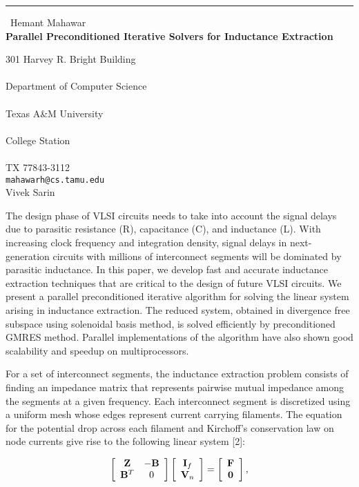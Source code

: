 \documentclass{report}
\begin{document}
\begin{center}
\rule{6in}{1pt} \
{\large Hemant Mahawar \\
{\bf Parallel Preconditioned Iterative Solvers for Inductance Extraction}}

301 Harvey R. Bright Building \\ \\ Department of Computer Science \\ \\ Texas A\&M University \\ \\ College Station \\  \\ TX 77843-3112
\\
{\tt mahawarh@cs.tamu.edu}\\
Vivek Sarin\end{center}

The design phase of VLSI circuits needs to take into account the signal
delays due to parasitic resistance (R), capacitance (C), and inductance
(L). With increasing clock frequency and integration density, signal
delays in next-generation circuits with millions of interconnect segments
will be dominated by parasitic inductance. In this paper, we develop fast
and accurate inductance extraction techniques that are critical to the
design of future VLSI circuits. We present a parallel preconditioned
iterative algorithm for solving the linear system arising in inductance
extraction. The reduced system, obtained in divergence free subspace
using solenoidal basis method, is solved efficiently by preconditioned
GMRES method. Parallel implementations of the algorithm have also shown
good scalability and speedup on multiprocessors.

For a set of interconnect segments, the inductance extraction problem
consists of finding an impedance matrix that represents pairwise mutual
impedance among the segments at a given frequency. Each interconnect
segment is discretized using a uniform mesh whose edges represent current
carrying filaments. The equation for the potential drop across each
filament and Kirchoff's conservation law on node currents give rise to
the following linear system [2]:

\begin{equation}
\label{eq:basic}
\left[\begin{array}
{c c} {\bf Z} & -{\bf B}\\
{\bf B}^{T} & 0 \end{array} \right ]
\left[\begin{array}
{c}{\bf I}_f \\ {\bf V}_n
\end{array}
\right]
=
\left[\begin{array}
{c}{\bf F} \\
{\bf 0}
\end{array}
\right] ,
\end{equation}
\end{document}
